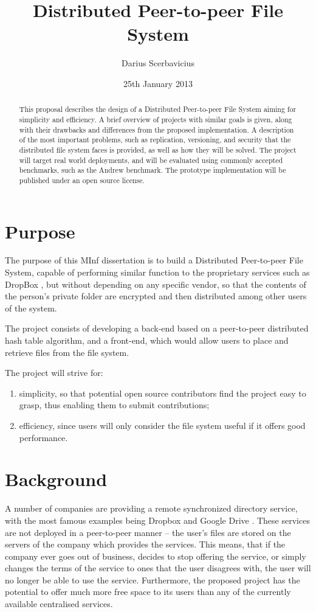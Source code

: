 \documentclass[8pt,a4paper]{article}
\title{Distributed Peer-to-peer File System}
\author{Darius Scerbavicius}
\date{25th January 2013}
\begin{document}
\maketitle

\begin{abstract}
This proposal describes the design of a Distributed Peer-to-peer File System aiming for simplicity and efficiency. A brief overview of projects with similar goals is given, along with their drawbacks and differences from the proposed implementation. A description of the most important problems, such as replication, versioning, and security that the distributed file system faces is provided, as well as how they will be solved. The project will target real world deployments, and will be evaluated using commonly accepted benchmarks, such as the Andrew benchmark. The prototype implementation will be published under an open source license.
\end{abstract}

\section{Purpose}
The purpose of this MInf dissertation is to build a Distributed Peer-to-peer File System, capable of performing similar function to the proprietary services such as DropBox \cite{dropbox}, but without depending on any specific vendor, so that the contents of the person's private folder are encrypted and then distributed among other users of the system. 

The project consists of developing a back-end based on a peer-to-peer distributed hash table algorithm, and a front-end, which would allow users to place and retrieve files from the file system.

The project will strive for:
\begin{enumerate}
\item simplicity, so that potential open source contributors find the project easy to grasp, thus enabling them to submit contributions;
\item efficiency, since users will only consider the file system useful if it offers good performance.
\end{enumerate}

\section{Background}

A number of companies are providing a remote synchronized directory service, with the most famous examples being Dropbox \cite{dropbox} and Google Drive \cite{gdrive}. These services are not deployed in a peer-to-peer manner -- the user's files are stored on the servers of the company which provides the services. This means, that if the company ever goes out of business, decides to stop offering the service, or simply changes the terms of the service to ones that the user disagrees with, the user will no longer be able to use the service. 
Furthermore, the proposed project has the potential to offer much more free space to its users than any of the currently available centralised services.
\end{document}
